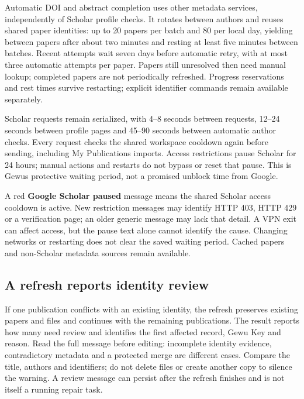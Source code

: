 \documentclass[10pt,letterpaper,oneside]{scrreprt}
\begin{document}
Automatic DOI and abstract completion uses other metadata services, independently of Scholar profile checks. It rotates between authors and reuses shared paper identities: up to 20 papers per batch and 80 per local day, yielding between papers after about two minutes and resting at least five minutes between batches. Recent attempts wait seven days before automatic retry, with at most three automatic attempts per paper. Papers still unresolved then need manual lookup; completed papers are not periodically refreshed. Progress reservations and rest times survive restarting; explicit identifier commands remain available separately.

Scholar requests remain serialized, with 4--8 seconds between requests, 12--24 seconds between profile pages and 45--90 seconds between automatic author checks. Every request checks the shared workspace cooldown again before sending, including My Publications imports. Access restrictions pause Scholar for 24 hours; manual actions and restarts do not bypass or reset that pause. This is Gewu\textquotesingle s protective waiting period, not a promised unblock time from Google.

A red \textbf{Google Scholar paused} message means the shared Scholar access cooldown is active. New restriction messages may identify HTTP 403, HTTP 429 or a verification page; an older generic message may lack that detail. A VPN exit can affect access, but the pause text alone cannot identify the cause. Changing networks or restarting does not clear the saved waiting period. Cached papers and non-Scholar metadata sources remain available.

\subsection{A refresh reports identity review}\label{a-refresh-reports-identity-review}

If one publication conflicts with an existing identity, the refresh preserves existing papers and files and continues with the remaining publications. The result reports how many need review and identifies the first affected record, Gewu Key and reason. Read the full message before editing: incomplete identity evidence, contradictory metadata and a protected merge are different cases. Compare the title, authors and identifiers; do not delete files or create another copy to silence the warning. A review message can persist after the refresh finishes and is not itself a running repair task.
\end{document}
